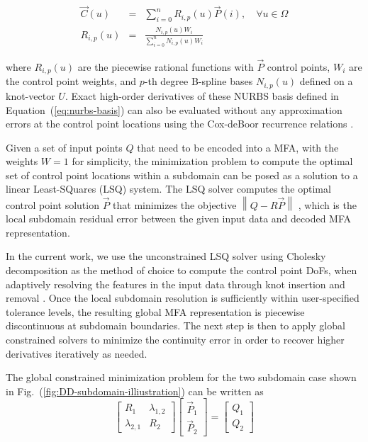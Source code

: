 \documentclass[conference]{IEEEtran}
\newcommand{\eqt}[1]{Equation~(\ref{#1})}
\newcommand{\fig}[1]{Fig.~(\ref{#1})}
\begin{document}
\begin{eqnarray}
\vec{C}(u) &=& \sum_{i=0}^{n} R_{i,p}(u) \vec{P}(i), \quad \forall u \in \Omega \\
R_{i,p}(u) &=& \frac{N_{i,p}(u) W_i}{\sum_{i=0}^{n} N_{i,p}(u) W_i}
\label{eq:nurbs-basis}
\end{eqnarray}

where $R_{i,p}(u)$ are the piecewise rational functions with $\vec{P}$ control points, $W_i$ are the control point weights, and $p$-th degree B-spline bases $N_{i,p}(u)$ defined on a knot-vector $U$. Exact high-order derivatives of these NURBS basis defined in \eqt{eq:nurbs-basis} can also be evaluated without any approximation errors at the control point locations using the Cox-deBoor recurrence relations \cite{de1983approximation}.

Given a set of input points $Q$ that need to be encoded into a MFA, with the weights $W=1$ for simplicity, the minimization problem to compute the optimal set of control point locations within a subdomain can be posed as a solution to a linear Least-SQuares (LSQ) system. The LSQ solver computes the optimal control point solution $\vec{P}$ that minimizes the objective $\left\lVert Q - R \vec{P} \right\rVert$ \cite{nurbs-book}, which is the local subdomain residual error between the given input data and decoded MFA representation.


In the current work, we use the unconstrained LSQ solver using Cholesky decomposition as the method of choice to compute the control point DoFs, when adaptively resolving the features in the input data through knot insertion and removal \cite{li-adaptive-2005}. Once the local subdomain resolution is sufficiently within user-specified tolerance levels, the resulting global MFA representation is piecewise discontinuous at subdomain boundaries. The next step is then to apply global constrained solvers to minimize the continuity error in order to recover higher derivatives iteratively as needed.

The global constrained minimization problem for the two subdomain case shown in \fig{fig:DD-subdomain-illiustration} can be written as
%
\begin{equation}
\left[
\begin{array}{c|c}
R_{1} & \lambda_{1,2} \\
\hline
\lambda_{2,1} & R_{2}
\end{array}
\right]
\left[
\begin{array}{c}
\vec{P}_{1} \\
\vec{P}_{2}
\end{array}
\right]
=
\left[
\begin{array}{c}
Q_{1} \\
Q_{2}
\end{array}
\right]
\label{eq:global-system}
\end{equation}
\end{document}
